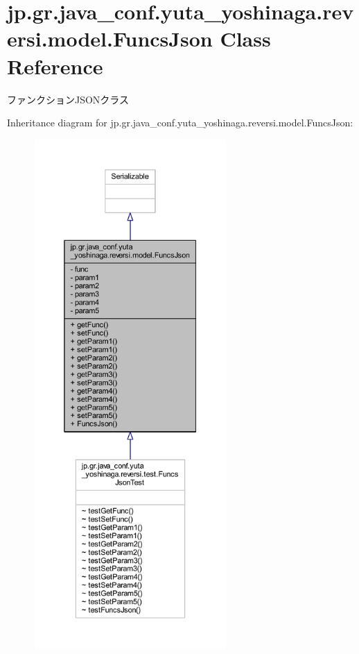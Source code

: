\hypertarget{classjp_1_1gr_1_1java__conf_1_1yuta__yoshinaga_1_1reversi_1_1model_1_1_funcs_json}{}\section{jp.\+gr.\+java\+\_\+conf.\+yuta\+\_\+yoshinaga.\+reversi.\+model.\+Funcs\+Json Class Reference}
\label{classjp_1_1gr_1_1java__conf_1_1yuta__yoshinaga_1_1reversi_1_1model_1_1_funcs_json}


ファンクション\+J\+S\+O\+Nクラス  




Inheritance diagram for jp.\+gr.\+java\+\_\+conf.\+yuta\+\_\+yoshinaga.\+reversi.\+model.\+Funcs\+Json\+:\nopagebreak
\begin{figure}[H]
\begin{center}
\leavevmode
\includegraphics[height=550pt]{classjp_1_1gr_1_1java__conf_1_1yuta__yoshinaga_1_1reversi_1_1model_1_1_funcs_json__inherit__graph}
\end{center}
\end{figure}


